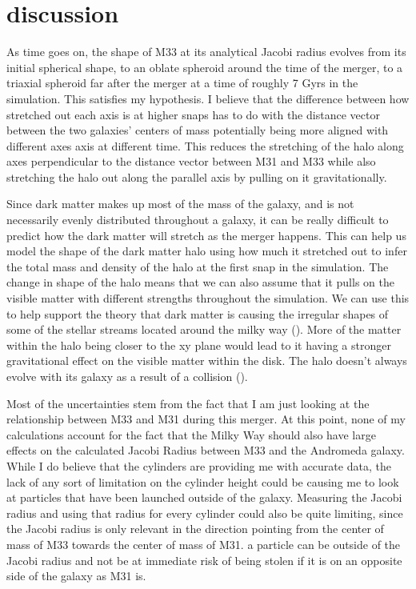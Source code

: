 \documentclass[fleqn,usenatbib]{mnras}
\begin{document}
\section{discussion}


	As time goes on, the shape of M33 at its analytical Jacobi radius evolves from its initial spherical shape, to an oblate spheroid around the time of the merger, to a triaxial spheroid far after the merger at a time of roughly 7 Gyrs in the simulation. This satisfies my hypothesis. I believe that the difference between how stretched out each axis is at higher snaps has to do with the distance vector between the two galaxies' centers of mass potentially being more aligned with different axes axis at different time. This reduces the stretching of the halo along axes perpendicular to the distance vector between M31 and M33 while also stretching the halo out along the parallel axis by pulling on it gravitationally.

    Since dark matter makes up most of the mass of the galaxy, and is not necessarily evenly distributed throughout a galaxy, it can be really difficult to predict how the dark matter will stretch as the merger happens. This can help us model the shape of the dark matter halo using how much it stretched out to infer the total mass and density of the halo at the first snap in the simulation. The change in shape of the halo means that we can also assume that it pulls on the visible matter with different strengths throughout the simulation. We can use this to help support the theory that dark matter is causing the irregular shapes of some of the stellar streams located around the milky way (\citet{Banik2018}). More of the matter within the halo being closer to the xy plane would lead to it having a stronger gravitational effect on the visible matter within the disk. The halo doesn’t always evolve with its galaxy as a result of a collision (\citet{Clowe2006}).

    Most of the uncertainties stem from the fact that I am just looking at the relationship between M33 and M31 during this merger. At this point, none of my calculations account for the fact that the Milky Way should also have large effects on the calculated Jacobi Radius between M33 and the Andromeda galaxy. While I do believe that the cylinders are providing me with accurate data, the lack of any sort of limitation on the cylinder height could be causing me to look at particles that have been launched outside of the galaxy. Measuring the Jacobi radius and using that radius for every cylinder could also be quite limiting, since the Jacobi radius is only relevant in the direction pointing from the center of mass of M33 towards the center of mass of M31. a particle can be outside of the Jacobi radius and not be at immediate risk of being stolen if it is on an opposite side of the galaxy as M31 is.
\end{document}
